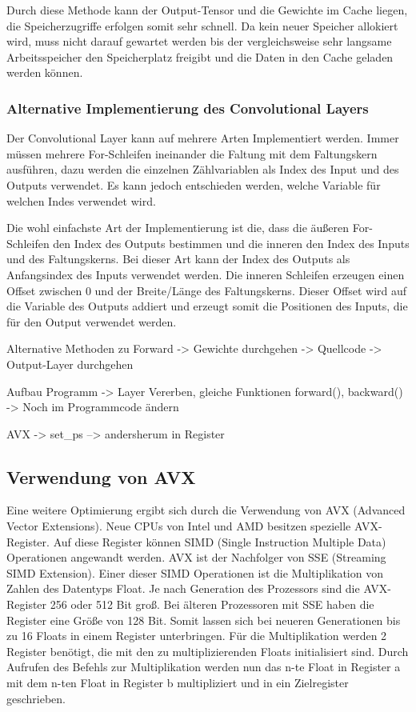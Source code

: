 \documentclass[../main.tex]{subfiles}
\begin{document}
Durch diese Methode kann der Output-Tensor und die Gewichte im Cache liegen, die Speicherzugriffe erfolgen somit sehr schnell. Da kein neuer Speicher allokiert wird, muss nicht darauf gewartet werden bis der vergleichsweise sehr langsame Arbeitsspeicher den Speicherplatz freigibt und die Daten in den Cache geladen werden können. 

\subsubsection{Alternative Implementierung des Convolutional Layers}

Der Convolutional Layer kann auf mehrere Arten Implementiert werden. Immer müssen mehrere For-Schleifen ineinander die Faltung mit dem Faltungskern ausführen, dazu werden die einzelnen Zählvariablen als Index des Input und des Outputs verwendet. Es kann jedoch entschieden werden, welche Variable für welchen Indes verwendet wird.

Die wohl einfachste Art der Implementierung ist die, dass die äußeren For-Schleifen den Index des Outputs bestimmen und die inneren den Index des Inputs und des Faltungskerns. Bei dieser Art kann der Index des Outputs als Anfangsindex des Inputs verwendet werden. Die inneren Schleifen erzeugen einen Offset zwischen 0 und der Breite/Länge des Faltungskerns. Dieser Offset wird auf die Variable des Outputs addiert und erzeugt somit die Positionen des Inputs, die für den Output verwendet werden.


Alternative Methoden zu Forward
-> Gewichte durchgehen
-> Quellcode
-> Output-Layer durchgehen

Aufbau Programm
-> Layer Vererben, gleiche Funktionen forward(), backward()
-> Noch im Programmcode ändern

AVX
-> set\_ps --> andersherum in Register



\subsection{Verwendung von AVX}

Eine weitere Optimierung ergibt sich durch die Verwendung von AVX (Advanced Vector Extensions).  Neue CPUs von Intel und AMD besitzen spezielle AVX-Register. Auf diese Register können SIMD (Single Instruction Multiple Data) Operationen angewandt werden. AVX ist der Nachfolger von SSE (Streaming SIMD Extension). Einer dieser SIMD Operationen ist die Multiplikation von Zahlen des Datentyps Float.
Je nach Generation des Prozessors sind die AVX-Register 256 oder 512 Bit groß. Bei älteren Prozessoren mit SSE haben die Register eine Größe von 128 Bit. Somit lassen sich bei neueren Generationen bis zu 16 Floats in einem Register unterbringen. Für die Multiplikation werden 2 Register benötigt, die mit den zu multiplizierenden Floats initialisiert sind. Durch Aufrufen des Befehls zur Multiplikation werden nun das n-te Float in Register a mit dem n-ten Float in Register b multipliziert und in ein Zielregister geschrieben.
\end{document}
